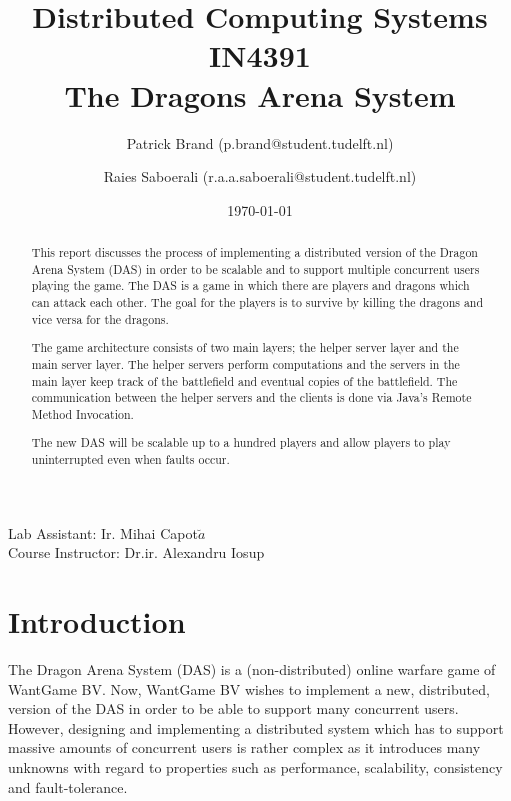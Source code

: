 \documentclass{article}
\title{Distributed Computing Systems IN4391\\ The Dragons Arena System %
}
\author{Patrick Brand (p.brand@student.tudelft.nl) \and
    Raies Saboerali (r.a.a.saboerali@student.tudelft.nl)
}
\date{\today}
\begin{document}
\maketitle
\thispagestyle{empty}
\begin{center}
Lab Assistant: Ir. Mihai Capot$\breve{a}$ \\
Course Instructor: Dr.ir. Alexandru Iosup
\end{center}

\begin{abstract}

This report discusses the process of implementing a distributed version of the Dragon Arena System (DAS) in order to be scalable and to support multiple concurrent users playing the game.
The DAS is a game in which there are players and dragons which can attack each other. 
The goal for the players is to survive by killing the dragons and vice versa for the dragons.

The game architecture consists of two main layers; the helper server layer and the main server layer.
The helper servers perform computations and the servers in the main layer keep track of the battlefield and eventual copies of the battlefield.
The communication between the helper servers and the clients is done via Java's Remote Method Invocation.

The new DAS will be scalable up to a hundred players and allow players to play uninterrupted even when faults occur.


\end{abstract}


\section{Introduction}


The Dragon Arena System (DAS) is a (non-distributed) online warfare game of WantGame BV.
Now, WantGame BV wishes to implement a new, distributed, version of the DAS in order to be able to support many concurrent users.
However, designing and implementing a distributed system which has to support massive amounts of concurrent users is rather complex as it introduces many unknowns with regard to properties such as performance, scalability, consistency and fault-tolerance.
\end{document}
